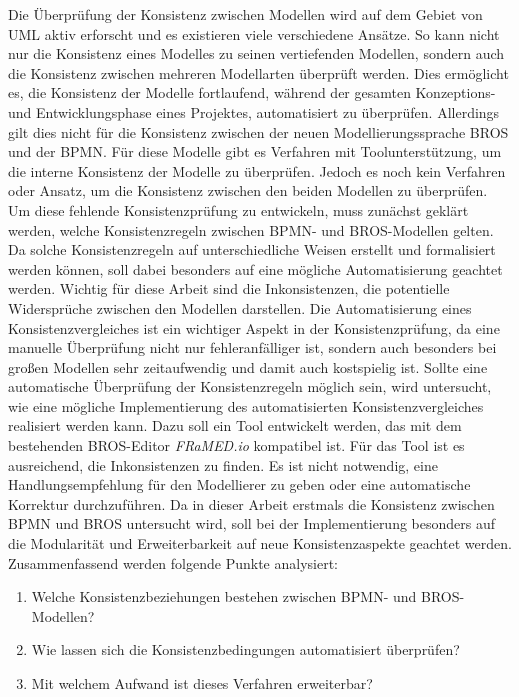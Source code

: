 Die Überprüfung der Konsistenz zwischen Modellen wird auf dem Gebiet von UML aktiv erforscht und es existieren viele verschiedene Ansätze.
So kann nicht nur die Konsistenz eines Modelles zu seinen vertiefenden Modellen, sondern auch die Konsistenz zwischen mehreren Modellarten überprüft werden.
Dies ermöglicht es, die Konsistenz der Modelle fortlaufend, während der gesamten Konzeptions- und Entwicklungsphase eines Projektes, automatisiert zu überprüfen. 
Allerdings gilt dies nicht für die Konsistenz zwischen der neuen Modellierungssprache BROS und der BPMN.
Für diese Modelle gibt es Verfahren mit Toolunterstützung, um die interne Konsistenz der Modelle zu überprüfen.
Jedoch es noch kein Verfahren oder Ansatz, um die Konsistenz zwischen den beiden Modellen zu überprüfen.
Um diese fehlende Konsistenzprüfung zu entwickeln, muss zunächst geklärt werden, welche Konsistenzregeln zwischen BPMN- und BROS-Modellen gelten.
Da solche Konsistenzregeln auf unterschiedliche Weisen erstellt und formalisiert werden können, soll dabei besonders auf eine mögliche Automatisierung geachtet werden.
Wichtig für diese Arbeit sind die Inkonsistenzen, die potentielle Widersprüche zwischen den Modellen darstellen. 
Die Automatisierung eines Konsistenzvergleiches ist ein wichtiger Aspekt in der Konsistenzprüfung, da eine manuelle Überprüfung nicht nur fehleranfälliger ist, sondern auch besonders bei großen Modellen sehr zeitaufwendig und damit auch kostspielig ist.
Sollte eine automatische Überprüfung der Konsistenzregeln möglich sein, wird untersucht, wie eine mögliche Implementierung des automatisierten Konsistenzvergleiches realisiert werden kann.
Dazu soll ein Tool entwickelt werden, das mit dem bestehenden BROS-Editor \emph{FRaMED.io} kompatibel ist.
Für das Tool ist es ausreichend, die Inkonsistenzen zu finden.
Es ist nicht notwendig, eine Handlungsempfehlung für den Modellierer zu geben oder eine automatische Korrektur durchzuführen. 
Da in dieser Arbeit erstmals die Konsistenz zwischen BPMN und BROS untersucht wird, soll bei der Implementierung besonders auf die Modularität und Erweiterbarkeit auf neue Konsistenzaspekte geachtet werden.
Zusammenfassend werden folgende Punkte analysiert:

\begin{enumerate}
    \item Welche Konsistenzbeziehungen bestehen zwischen BPMN- und BROS-Modellen?
    \item Wie lassen sich die Konsistenzbedingungen automatisiert überprüfen?
    \item Mit welchem Aufwand ist dieses Verfahren erweiterbar?
\end{enumerate}

